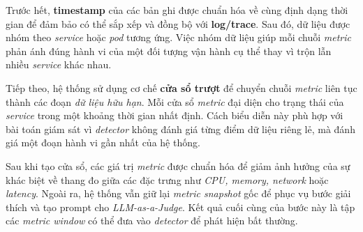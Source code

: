 Trước hết, \textbf{timestamp }của các bản ghi được chuẩn hóa về cùng định dạng thời gian để đảm bảo có thể sắp xếp và đồng bộ với \textbf{log/trace}. Sau đó, dữ liệu được nhóm theo \textit{service} hoặc \textit{pod} tương ứng. Việc nhóm dữ liệu giúp mỗi chuỗi \textit{metric} phản ánh đúng hành vi của một đối tượng vận hành cụ thể thay vì trộn lẫn nhiều \textit{service} khác nhau.

Tiếp theo, hệ thống sử dụng cơ chế \textbf{cửa sổ trượt} để chuyển chuỗi \textit{metric} liên tục thành các đoạn \textit{dữ liệu hữu hạn}. Mỗi cửa sổ \textit{metric} đại diện cho trạng thái của \textit{service} trong một khoảng thời gian nhất định. Cách biểu diễn này phù hợp với bài toán giám sát vì \textit{detector} không đánh giá từng điểm dữ liệu riêng lẻ, mà đánh giá một đoạn hành vi gần nhất của hệ thống.

Sau khi tạo cửa sổ, các giá trị \textit{metric} được chuẩn hóa để giảm ảnh hưởng của sự khác biệt về thang đo giữa các đặc trưng như \textit{CPU, memory, network} hoặc \textit{latency}. Ngoài ra, hệ thống vẫn giữ lại \textit{metric snapshot} gốc để phục vụ bước giải thích và tạo prompt cho \textit{LLM-as-a-Judge}. Kết quả cuối cùng của bước này là tập các \textit{metric window} có thể đưa vào \textit{detector} để phát hiện bất thường.
